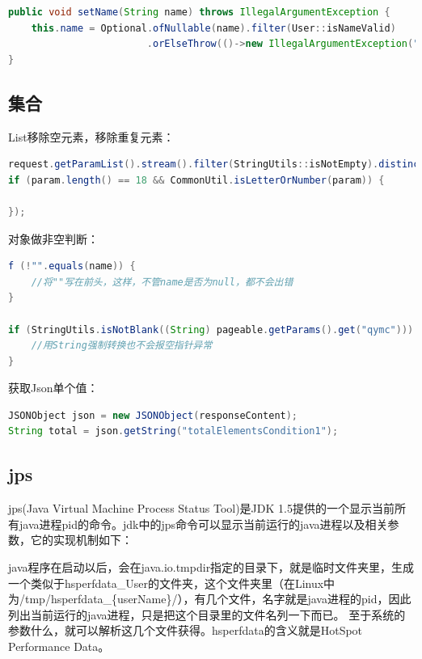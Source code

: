 \documentclass[letter]{book}
\begin{document}
\begin{lstlisting}[language=Java]
public void setName(String name) throws IllegalArgumentException {
	this.name = Optional.ofNullable(name).filter(User::isNameValid)
						.orElseThrow(()->new IllegalArgumentException("Invalid username."));
}
\end{lstlisting}

\subsection{集合}

List移除空元素，移除重复元素：


\begin{lstlisting}[language=Java]
request.getParamList().stream().filter(StringUtils::isNotEmpty).distinct().forEach(param -> {
if (param.length() == 18 && CommonUtil.isLetterOrNumber(param)) {

});
\end{lstlisting}

对象做非空判断：

\begin{lstlisting}[language=Java]
f (!"".equals(name)) {
	//将""写在前头，这样，不管name是否为null，都不会出错
}

if (StringUtils.isNotBlank((String) pageable.getParams().get("qymc"))) {
	//用String强制转换也不会报空指针异常
} 
\end{lstlisting}

获取Json单个值：

\begin{lstlisting}[language=Java]
JSONObject json = new JSONObject(responseContent);
String total = json.getString("totalElementsCondition1");
\end{lstlisting}


\subsection{jps}

jps(Java Virtual Machine Process Status Tool)是JDK 1.5提供的一个显示当前所有java进程pid的命令。jdk中的jps命令可以显示当前运行的java进程以及相关参数，它的实现机制如下：

java程序在启动以后，会在java.io.tmpdir指定的目录下，就是临时文件夹里，生成一个类似于hsperfdata\_User的文件夹，这个文件夹里（在Linux中为/tmp/hsperfdata\_\{userName\}/），有几个文件，名字就是java进程的pid，因此列出当前运行的java进程，只是把这个目录里的文件名列一下而已。 至于系统的参数什么，就可以解析这几个文件获得。hsperfdata的含义就是HotSpot Performance Data。
\end{document}
